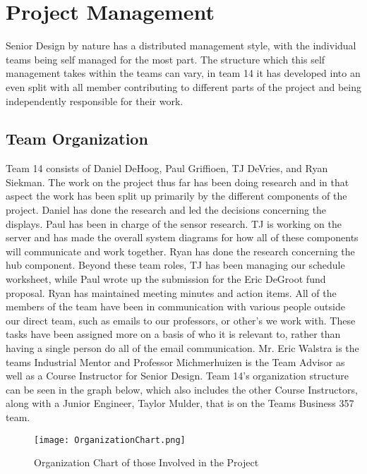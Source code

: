 \documentclass[PPFS.tex]{template/subfiles}
\begin{document}
\section{Project Management}
Senior Design by nature has a distributed management style, with the individual teams being self managed for the most part. The structure which this self management takes within the teams can vary, in team 14 it has developed into an even split with all member contributing to different parts of the project and being independently responsible for their work. 

    \subsection{Team Organization}
	Team 14 consists of Daniel DeHoog, Paul Griffioen, TJ DeVries, and Ryan Siekman. The work on the project thus far has been doing research and in that aspect the work has been split up primarily by the different components of the project. Daniel has done the research and led the decisions concerning the displays. Paul has been in charge of the sensor research. TJ is working on the server and has made the overall system diagrams for how all of these components will communicate and work together. Ryan has done the research concerning the hub component. Beyond these team roles, TJ has been managing our schedule worksheet, while Paul wrote up the submission for the Eric DeGroot fund proposal. Ryan has maintained meeting minutes and action items. All of the members of the team have been in communication with various people outside our direct team, such as emails to our professors, or other's we work with. These tasks have been assigned more on a basis of who it is relevant to, rather than having a single person do all of the email communication. Mr. Eric Walstra is the teams Industrial Mentor and Professor Michmerhuizen is the Team Advisor as well as a Course Instructor for Senior Design. Team 14's organization structure can be seen in the graph below, which also includes the other Course Instructors, along with a Junior Engineer, Taylor Mulder, that is on the Teams Business 357 team. 
	
	\begin{figure}[h]
		\centering
		\texttt{[image: OrganizationChart.png]}
		\caption{Organization Chart of those Involved in the Project}
	\end{figure}
	
\end{document}

